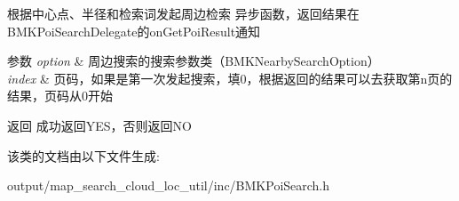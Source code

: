根据中心点、半径和检索词发起周边检索 异步函数，返回结果在\+B\+M\+K\+Poi\+Search\+Delegate的on\+Get\+Poi\+Result通知 
\begin{DoxyParams}{参数}
{\em option} & 周边搜索的搜索参数类（\+B\+M\+K\+Nearby\+Search\+Option） \\
\hline
{\em index} & 页码，如果是第一次发起搜索，填0，根据返回的结果可以去获取第n页的结果，页码从0开始 \\
\hline
\end{DoxyParams}
\begin{DoxyReturn}{返回}
成功返回\+Y\+E\+S，否则返回\+N\+O 
\end{DoxyReturn}


该类的文档由以下文件生成\+:\begin{DoxyCompactItemize}
\item 
output/map\+\_\+search\+\_\+cloud\+\_\+loc\+\_\+util/inc/B\+M\+K\+Poi\+Search.\+h\end{DoxyCompactItemize}
